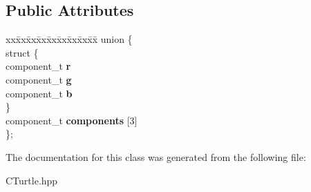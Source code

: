\subsection*{Public Attributes}
\begin{DoxyCompactItemize}
\item 
\mbox{\label{classcturtle_1_1Color_a7c49039a0cacbafd43bd5e3fc152f6d7}} 
\begin{tabbing}
xx\=xx\=xx\=xx\=xx\=xx\=xx\=xx\=xx\=\kill
union \{\\
\mbox{\label{unioncturtle_1_1Color_1_1_0D0_ad59671efb0c31ea441e40662cddb1090}} 
\>struct \{\\
\>\>component\_t {\bfseries r}\\
\>\>component\_t {\bfseries g}\\
\>\>component\_t {\bfseries b}\\
\>\} \\
\>component\_t {\bfseries components} \mbox{[}3\mbox{]}\\
\}; \\

\end{tabbing}\end{DoxyCompactItemize}


The documentation for this class was generated from the following file\+:\begin{DoxyCompactItemize}
\item 
C\+Turtle.\+hpp\end{DoxyCompactItemize}
